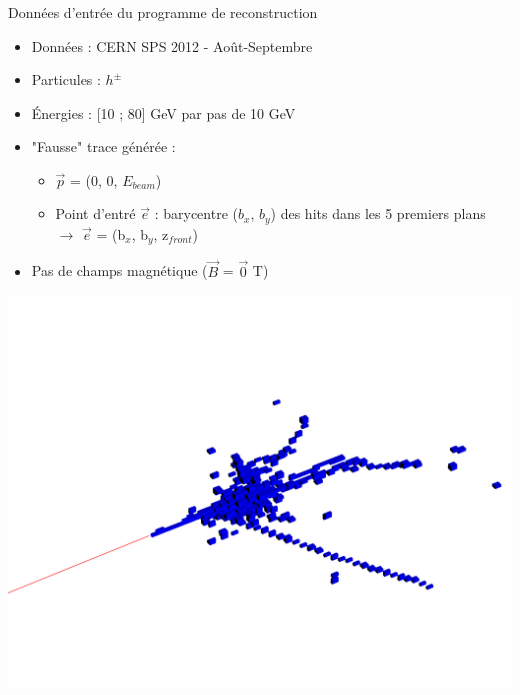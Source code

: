 \documentclass[8pt]{beamer}
\begin{document}
  \begin{frame}
  \frametitle{\secname}
  \framesubtitle{\subsecname}
    \begin{minipage}{0.56\linewidth}
      \begin{block}{Données d'entrée du programme de reconstruction}
        \begin{itemize}
          \item Données : CERN SPS 2012 - Août-Septembre \\
          \item Particules : $h^{\pm}$
          \item Énergies : [10 ; 80] GeV par pas de 10 GeV
          \item "Fausse" trace générée : 
          \begin{itemize}
            \item $\vec{p}$ = (0, 0, $E_{beam}$)
            \item Point d'entré $\vec{e}$ : barycentre ($b_x$, $b_y$) des hits dans les 5 premiers plans \\
            $\rightarrow$ $\vec{e}$ = (b$_x$, b$_y$, z$_{front}$)
          \end{itemize}
          \item Pas de champs magnétique ($\vec{B}$ = $\vec{0}$ T)
        \end{itemize}
      \end{block}
    \end{minipage} \hfill
    \begin{minipage}{0.43\linewidth}
      \begin{center}
        \includegraphics[width=0.9\linewidth]{SingleParticleSetup.pdf}      
      \end{center}
    \end{minipage}
  \end{frame}
  
\end{document}
